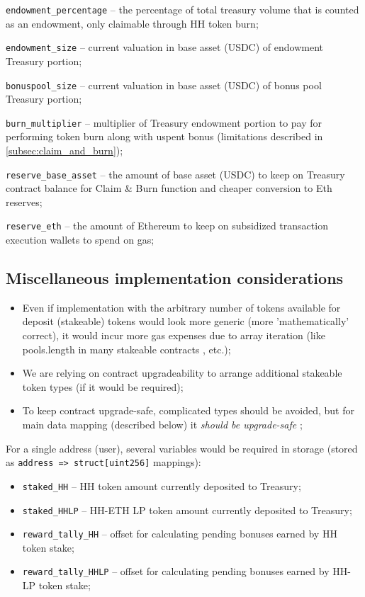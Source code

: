 \documentclass[12pt]{article}
\begin{document}
\begin{hangparas}{.25in}{1}

\texttt{endowment\_percentage} -- the percentage of total treasury volume that is counted as an endowment, only claimable through HH token burn;

\texttt{endowment\_size} -- current valuation in base asset (USDC) of endowment Treasury portion;

\texttt{bonuspool\_size} -- current valuation in base asset (USDC) of bonus pool Treasury portion;

\texttt{burn\_multiplier} -- multiplier of Treasury endowment portion to pay for performing token burn along with uspent bonus (limitations described in \ref{subsec:claim_and_burn});

\texttt{reserve\_base\_asset} -- the amount of base asset (USDC) to keep on Treasury contract balance for Claim \& Burn function and cheaper conversion to Eth reserves;

\texttt{reserve\_eth} -- the amount of Ethereum to keep on subsidized transaction execution wallets to spend on gas;

\end{hangparas}


\bigskip

\subsection{Miscellaneous implementation considerations}

\begin{itemize}
\item Even if implementation with the arbitrary number of tokens available for deposit (stakeable) tokens would
  look more generic (more 'mathematically' correct), it would incur more gas expenses due
  to array iteration (like pools.length in many stakeable contracts \cite{sushichef}, etc.);
\item We are relying on contract upgradeability to arrange additional stakeable token types
  (if it would be required);
\item To keep contract upgrade-safe, complicated types should be avoided, but for main data mapping (described below) it \emph{should be upgrade-safe} \cite{upgradeable_map_structs};
\end{itemize}

For a single address (user), several variables would be required in storage (stored as \texttt{address => struct[uint256]} mappings):
\begin{itemize}
\item \texttt{staked\_HH} -- HH token amount currently deposited to Treasury;
\item \texttt{staked\_HHLP} -- HH-ETH LP token amount currently deposited to Treasury;
\item \texttt{reward\_tally\_HH} -- offset for calculating pending bonuses earned by HH token stake;
\item \texttt{reward\_tally\_HHLP} -- offset for calculating pending bonuses earned by HH-LP token stake;
\end{itemize}
\end{document}
